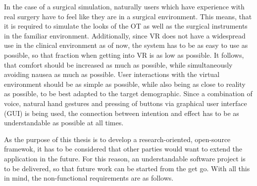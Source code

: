 In the case of a surgical simulation, naturally users which have experience with real surgery have to feel like they are in a surgical environment.
This means, that it is required to simulate the looks of the OT as well as the surgical instruments in the familiar environment.
Additionally, since VR does not have a widespread use in the clinical environment as of now, the system has to be as easy to use as possible, so that fraction when getting into VR is as low as possible.
It follows, that comfort should be increased as much as possible, while simultaneously avoiding nausea as much as possible.
User interactions with the virtual environment should be as simple as possible, while also being as close to reality as possible, to be best adapted to the target demographic.
Since a combination of voice, natural hand gestures and pressing of buttons via graphical user interface (GUI) is being used, the connection between intention and effect has to be as 
understandable as possible at all times.

As the purpose of this thesis is to develop a research-oriented, open-source framewok, it has to be considered that other parties would want to extend the application in the future.
For this reason, an understandable software project is to be delivered, so that future work can be started from the get go.
With all this in mind, the non-functional requirements are as follows.


